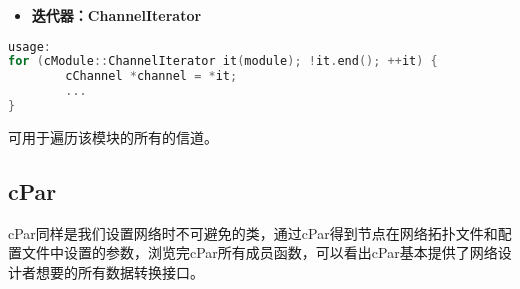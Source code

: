 \begin{itemize}
\item \textbf{迭代器：ChannelIterator}

\end{itemize}

\begin{lstlisting}[language=c]
usage:
for (cModule::ChannelIterator it(module); !it.end(); ++it) {
        cChannel *channel = *it;
        ...
}
\end{lstlisting}

可用于遍历该模块的所有的信道。

\subsection{cPar}
\label{cpar}

cPar同样是我们设置网络时不可避免的类，通过cPar得到节点在网络拓扑文件和配置文件中设置的参数，浏览完cPar所有成员函数，可以看出cPar基本提供了网络设计者想要的所有数据转换接口。

